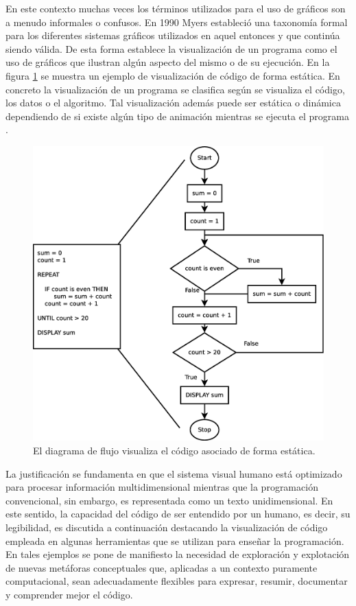 \documentclass{llncs}
\begin{document}
En este contexto muchas veces los términos utilizados para el uso de gráficos son a menudo informales o confusos. En 1990 Myers \cite{myers1990taxonomies} estableció una taxonomía formal para los diferentes sistemas gráficos utilizados en aquel entonces y que continúa siendo válida. De esta forma establece la visualización de un programa como el uso de gráficos que ilustran algún aspecto del mismo o de su ejecución. En la figura \ref{fig:flowchart} se muestra un ejemplo de visualización de código de forma estática. En concreto la visualización de un programa se clasifica según se visualiza el código, los datos o el algoritmo. Tal visualización además puede ser estática o dinámica dependiendo de si existe algún tipo de animación mientras se ejecuta el programa \cite{urquiza2009survey}. 

\begin{figure}[ht]
\begin{center}
\includegraphics[scale=0.25]{images/flowchart.eps}
\caption{El diagrama de flujo visualiza el código asociado de forma estática.
\label{fig:flowchart}}
\end{center}
\end{figure}

La justificación se fundamenta en que el sistema visual humano está optimizado para procesar información multidimensional mientras que la programación convencional, sin embargo, es representada como un texto unidimensional. En este sentido, la capacidad del código de ser entendido por un humano, es decir, su legibilidad, es discutida a continuación destacando la visualización de código empleada en algunas herramientas que se utilizan para enseñar la programación. En tales ejemplos se pone de manifiesto la necesidad de exploración y explotación de nuevas metáforas conceptuales que, aplicadas a un contexto puramente computacional, sean adecuadamente flexibles para expresar, resumir, documentar y comprender mejor el código. 
\end{document}

